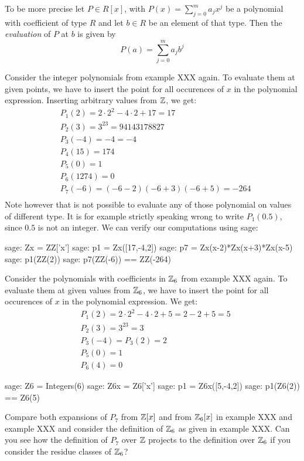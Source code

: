 To be more precise let $P\in R[x]$, with $P(x)=\sum_{j=0}^m a_j x^j$ be a polynomial with coefficient of type $R$ and let $b\in R$ be an element of that type. Then the \textit{evaluation} of $P$ at $b$ is given by
\begin{equation}
P(a) = \sum_{j=0}^m a_j b^j
\end{equation}
\begin{example}Consider the integer polynomials from example XXX again. To evaluate them at given points, we have to insert the point for all occurences of $x$ in the polynomial expression. Inserting arbitrary values from $\mathbb{Z}$, we get:
\begin{align*}
 &P_1(2)    = 2\cdot 2^2 -4\cdot 2 +17 = 17 \\
 &P_2(3)    = 3^{23}=94143178827 \\
 &P_3(-4)   = -4 = -4 \\
 &P_4(15)   = 174 \\
 &P_5(0)    = 1 \\
 &P_6(1274) =0 \\
 &P_7(-6)   = (-6-2)(-6+3)(-6+5) = -264 \\
\end{align*}
Note however that is not possible to evaluate any of those polynomial on values of different type. It is for example strictly speaking wrong to write $P_1(0.5)$, since $0.5$ is not an integer. We can verify our computations using sage:
\begin{sagecommandline}
sage: Zx = ZZ['x']
sage: p1 = Zx([17,-4,2])
sage: p7 = Zx(x-2)*Zx(x+3)*Zx(x-5)
sage: p1(ZZ(2))
sage: p7(ZZ(-6)) == ZZ(-264)
\end{sagecommandline}

\end{example}
\begin{example} Consider the polynomials with coefficients in $\mathbb{Z}_6$ from example XXX again. To evaluate them at given values from $\mathbb{Z}_6$, we have to insert the point for all occurences of $x$ in the polynomial expression. We get:
\begin{align*}
 & P_1(2)= 2\cdot 2^2 -4\cdot 2 +5 = 2 - 2 + 5 = 5\\
 &P_2(3)= 3^{23}=3\\
 &P_3(-4)= P_3(2) = 2\\
 &P_5(0)= 1\\
 &P_6(4)=0
\end{align*}
\begin{sagecommandline}
sage: Z6 = Integers(6)
sage: Z6x = Z6['x']
sage: p1 = Z6x([5,-4,2])
sage: p1(Z6(2)) == Z6(5)
\end{sagecommandline}

\end{example}
\begin{exercise}
Compare both expansions of $P_7$ from $\mathbb{Z}[x]$ and from $\mathbb{Z}_6[x]$ in example XXX and example XXX and consider the definition of $\mathbb{Z}_6$ as given in example XXX. Can you see how the definition of $P_7$ over $\mathbb{Z}$ projects to the definition over $\mathbb{Z}_6$ if you consider the residue classes of $\mathbb{Z}_6$?
\end{exercise}
